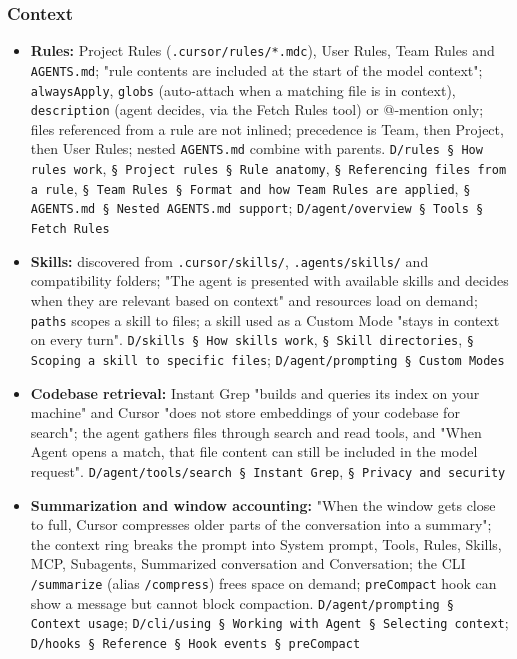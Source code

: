 \subsubsection*{Context}
\begin{itemize}
\item \textbf{Rules:} Project Rules (\texttt{.\allowbreak{}cursor/\allowbreak{}rules/\allowbreak{}*.\allowbreak{}mdc}), User Rules, Team Rules and \texttt{AGENTS.\allowbreak{}md}; "rule contents are included at the start of the model context"; \texttt{alwaysApply}, \texttt{globs} (auto-attach when a matching file is in context), \texttt{description} (agent decides, via the Fetch Rules tool) or @-mention only; files referenced from a rule are not inlined; precedence is Team, then Project, then User Rules; nested \texttt{AGENTS.\allowbreak{}md} combine with parents. \texttt{D/\allowbreak{}rules § How rules work}, \texttt{§ Project rules § Rule anatomy}, \texttt{§ Referencing files from a rule}, \texttt{§ Team Rules § Format and how Team Rules are applied}, \texttt{§ AGENTS.\allowbreak{}md § Nested AGENTS.\allowbreak{}md support}; \texttt{D/\allowbreak{}agent/\allowbreak{}overview § Tools § Fetch Rules}
\item \textbf{Skills:} discovered from \texttt{.\allowbreak{}cursor/\allowbreak{}skills/\allowbreak{}}, \texttt{.\allowbreak{}agents/\allowbreak{}skills/\allowbreak{}} and compatibility folders; "The agent is presented with available skills and decides when they are relevant based on context" and resources load on demand; \texttt{paths} scopes a skill to files; a skill used as a Custom Mode "stays in context on every turn". \texttt{D/\allowbreak{}skills § How skills work}, \texttt{§ Skill directories}, \texttt{§ Scoping a skill to specific files}; \texttt{D/\allowbreak{}agent/\allowbreak{}prompting § Custom Modes}
\item \textbf{Codebase retrieval:} Instant Grep "builds and queries its index on your machine" and Cursor "does not store embeddings of your codebase for search"; the agent gathers files through search and read tools, and "When Agent opens a match, that file content can still be included in the model request". \texttt{D/\allowbreak{}agent/\allowbreak{}tools/\allowbreak{}search § Instant Grep}, \texttt{§ Privacy and security}
\item \textbf{Summarization and window accounting:} "When the window gets close to full, Cursor compresses older parts of the conversation into a summary"; the context ring breaks the prompt into System prompt, Tools, Rules, Skills, MCP, Subagents, Summarized conversation and Conversation; the CLI \texttt{/\allowbreak{}summarize} (alias \texttt{/\allowbreak{}compress}) frees space on demand; \texttt{preCompact} hook can show a message but cannot block compaction. \texttt{D/\allowbreak{}agent/\allowbreak{}prompting § Context usage}; \texttt{D/\allowbreak{}cli/\allowbreak{}using § Working with Agent § Selecting context}; \texttt{D/\allowbreak{}hooks § Reference § Hook events § preCompact}

\end{itemize}

